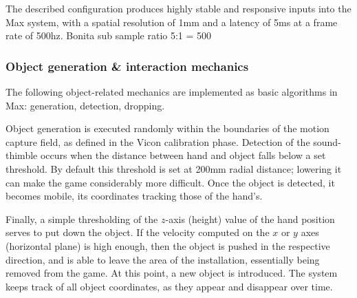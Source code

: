 \documentclass{nime-alternate}
\begin{document}


The described configuration produces highly stable and responsive inputs into the Max system, with a spatial resolution of 1mm and a latency of 5ms at a frame rate of 500hz.\cite{song2016fast}
Bonita sub sample ratio 5:1 = 500

\subsubsection{Object generation \& interaction mechanics}

The following object-related mechanics are implemented as basic algorithms in Max: generation, detection, dropping.

Object generation is executed randomly within the boundaries of the motion capture field, as defined in the Vicon calibration phase. Detection of the sound-thimble occurs when the distance between hand and object falls below a set threshold. By default this threshold is set at 200mm radial distance; lowering it can make the game considerably more difficult. Once the object is detected, it becomes mobile, its coordinates tracking those of the hand's.

Finally, a simple thresholding of the $z$-axis (height) value of the hand position serves to put down the object. If the velocity computed on the $x$ or $y$ axes (horizontal plane) is high enough, then the object is pushed in the respective direction, and is able to leave the area of the installation, essentially being removed from the game.
At this point, a new object is introduced. The system keeps track of all object coordinates, as they appear and disappear over time.
\end{document}
